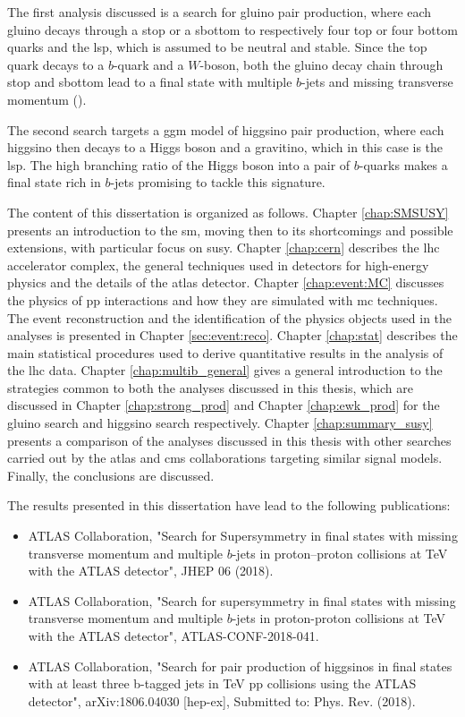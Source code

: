 The first analysis discussed is a search for gluino pair production, where each gluino decays through a stop or a sbottom 
to respectively four top or four bottom quarks and the \gls{lsp}, which is assumed to be neutral and stable.
Since the top quark decays to a $b$-quark and a $W$-boson, both the gluino decay chain through stop and sbottom lead to a 
final state with multiple $b$-jets and missing transverse momentum (\met). 

The second search targets a \gls{ggm} model of higgsino pair production, where each higgsino then decays to a Higgs boson and 
a gravitino, which in this case is the \gls{lsp}. The high branching ratio of the Higgs boson into a pair of $b$-quarks makes a final state 
rich in $b$-jets promising to tackle this signature.

The content of this dissertation is organized as follows. Chapter \ref{chap:SMSUSY} presents an introduction to the \gls{sm}, 
moving then to its shortcomings and possible extensions, with particular focus on \gls{susy}. 
Chapter \ref{chap:cern} describes the \gls{lhc} accelerator complex, the general techniques used in detectors 
for high-energy physics and the details of the \gls{atlas} detector. 
Chapter \ref{chap:event:MC} discusses the physics of \gls{pp} interactions and how they are simulated with \gls{mc} techniques. 
The event reconstruction and the identification of the physics objects used in the analyses is presented in Chapter \ref{sec:event:reco}. 
Chapter \ref{chap:stat} describes the main statistical procedures used to derive quantitative results in the analysis of the \gls{lhc} data.
Chapter \ref{chap:multib_general} gives a general introduction to the strategies common to both the analyses discussed in this thesis, 
which are discussed in Chapter \ref{chap:strong_prod} and Chapter \ref{chap:ewk_prod} for the gluino search and 
higgsino search respectively. 
Chapter \ref{chap:summary_susy} presents a comparison of the analyses discussed in this thesis with other searches carried out 
by the \gls{atlas} and \gls{cms} collaborations targeting similar signal models. 
Finally, the conclusions are discussed. 

The results presented in this dissertation have lead to the following publications:

\begin{itemize}
\item  ATLAS Collaboration, "Search for Supersymmetry in final states with missing transverse momentum and multiple $b$-jets in proton–proton collisions at \cmtre TeV with the ATLAS detector", JHEP 06 (2018). 
\item  ATLAS Collaboration, "Search for supersymmetry in final states with missing transverse momentum and multiple $b$-jets in proton-proton collisions at \cmtre TeV with the ATLAS detector", ATLAS-CONF-2018-041.
\item  ATLAS Collaboration, "Search for pair production of higgsinos in final states with at least three b-tagged jets in \cmtre TeV pp collisions using the ATLAS detector",  
arXiv:1806.04030 [hep-ex], 
Submitted to: Phys. Rev. (2018).
\end{itemize}

